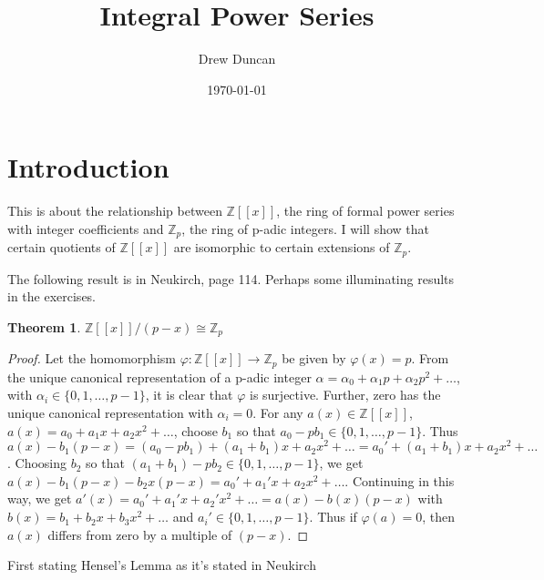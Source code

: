 \documentclass{article}
\title{Integral Power Series}
\author{Drew Duncan}
\date{\today}
\newtheorem{theorem}{Theorem}
\begin{document}
\maketitle

\section{Introduction}

This is about the relationship between $\mathbb{Z}[[x]]$, the ring of formal power series with integer coefficients and $\mathbb{Z}_p$, the ring of p-adic integers.  I will show that certain quotients of $\mathbb{Z}[[x]]$ are isomorphic to certain extensions of $\mathbb{Z}_p$.

The following result is in Neukirch, page 114.  Perhaps some illuminating results in the exercises.

\begin{theorem}\label{Z_p}
$\mathbb{Z}[[x]]/(p-x) \cong \mathbb{Z}_p$
\end{theorem}
\begin{proof}
Let the homomorphism $\varphi : \mathbb{Z}[[x]] \rightarrow \mathbb{Z}_p$ be given by $\varphi(x) = p$.  From the unique canonical representation of a p-adic integer $\alpha = \alpha_0 + \alpha_1 p  + \alpha_2 p^2 + \ldots$, with $\alpha_i \in \{0, 1, \ldots, p-1\}$, it is clear that $\varphi$ is surjective.  Further, zero has the unique canonical  representation with $\alpha_i = 0$.  For any $a(x) \in \mathbb{Z}[[x]]$, $a(x) = a_0 + a_1 x + a_2 x^2 + \ldots$, choose $b_1$ so that $a_0 - pb_1 \in \{0, 1, \ldots, p-1\}$.  Thus $a(x) - b_1(p-x) = (a_0 - pb_1) + (a_1 + b_1)x + a_2 x^2 + \ldots = a_0' + (a_1 + b_1)x + a_2 x^2 + \ldots$.  Choosing $b_2$ so that $(a_1 + b_1) - pb_2 \in \{0, 1, \ldots, p-1\}$, we get $a(x) - b_1(p-x) - b_2x(p-x) = a_0' + a_1'x + a_2 x^2 + \ldots$.  Continuing in this way, we get $a'(x)= a_0' + a_1'x + a_2' x^2 + \ldots = a(x) - b(x)(p-x)$ with $b(x) = b_1 + b_2x + b_3x^2 + \ldots$ and $a_i' \in \{0,1,\ldots,p-1\}$.  Thus if $\varphi(a) = 0$, then $a(x)$ differs from zero by a multiple of $(p-x)$.
\end{proof}

First stating Hensel's Lemma as it's stated in Neukirch
\end{document}
